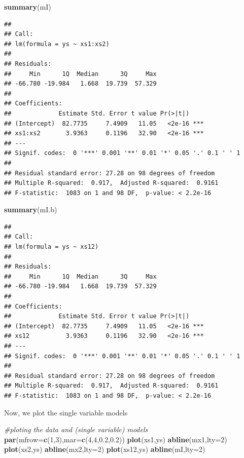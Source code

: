 \documentclass[
]{book}
\newenvironment{Shaded}{\begin{snugshade}}{\end{snugshade}}
\newcommand{\AttributeTok}[1]{\textcolor[rgb]{0.13,0.29,0.53}{#1}}
\newcommand{\CommentTok}[1]{\textcolor[rgb]{0.56,0.35,0.01}{\textit{#1}}}
\newcommand{\DecValTok}[1]{\textcolor[rgb]{0.00,0.00,0.81}{#1}}
\newcommand{\FloatTok}[1]{\textcolor[rgb]{0.00,0.00,0.81}{#1}}
\newcommand{\FunctionTok}[1]{\textcolor[rgb]{0.13,0.29,0.53}{\textbf{#1}}}
\newcommand{\NormalTok}[1]{#1}
\begin{document}
\begin{Shaded}
\begin{Highlighting}[]
\FunctionTok{summary}\NormalTok{(mI)}
\end{Highlighting}
\end{Shaded}

\begin{verbatim}
## 
## Call:
## lm(formula = ys ~ xs1:xs2)
## 
## Residuals:
##     Min      1Q  Median      3Q     Max 
## -66.780 -19.984   1.668  19.739  57.329 
## 
## Coefficients:
##             Estimate Std. Error t value Pr(>|t|)    
## (Intercept)  82.7735     7.4909   11.05   <2e-16 ***
## xs1:xs2       3.9363     0.1196   32.90   <2e-16 ***
## ---
## Signif. codes:  0 '***' 0.001 '**' 0.01 '*' 0.05 '.' 0.1 ' ' 1
## 
## Residual standard error: 27.28 on 98 degrees of freedom
## Multiple R-squared:  0.917,  Adjusted R-squared:  0.9161 
## F-statistic:  1083 on 1 and 98 DF,  p-value: < 2.2e-16
\end{verbatim}

\begin{Shaded}
\begin{Highlighting}[]
\FunctionTok{summary}\NormalTok{(mI.b)}
\end{Highlighting}
\end{Shaded}

\begin{verbatim}
## 
## Call:
## lm(formula = ys ~ xs12)
## 
## Residuals:
##     Min      1Q  Median      3Q     Max 
## -66.780 -19.984   1.668  19.739  57.329 
## 
## Coefficients:
##             Estimate Std. Error t value Pr(>|t|)    
## (Intercept)  82.7735     7.4909   11.05   <2e-16 ***
## xs12          3.9363     0.1196   32.90   <2e-16 ***
## ---
## Signif. codes:  0 '***' 0.001 '**' 0.01 '*' 0.05 '.' 0.1 ' ' 1
## 
## Residual standard error: 27.28 on 98 degrees of freedom
## Multiple R-squared:  0.917,  Adjusted R-squared:  0.9161 
## F-statistic:  1083 on 1 and 98 DF,  p-value: < 2.2e-16
\end{verbatim}

Now, we plot the single variable models

\begin{Shaded}
\begin{Highlighting}[]
\CommentTok{\#ploting the data and (single variable) models}
\FunctionTok{par}\NormalTok{(}\AttributeTok{mfrow=}\FunctionTok{c}\NormalTok{(}\DecValTok{1}\NormalTok{,}\DecValTok{3}\NormalTok{),}\AttributeTok{mar=}\FunctionTok{c}\NormalTok{(}\DecValTok{4}\NormalTok{,}\DecValTok{4}\NormalTok{,}\FloatTok{0.2}\NormalTok{,}\FloatTok{0.2}\NormalTok{))}
\FunctionTok{plot}\NormalTok{(xs1,ys)}
\FunctionTok{abline}\NormalTok{(mx1,}\AttributeTok{lty=}\DecValTok{2}\NormalTok{)}
\FunctionTok{plot}\NormalTok{(xs2,ys)}
\FunctionTok{abline}\NormalTok{(mx2,}\AttributeTok{lty=}\DecValTok{2}\NormalTok{)}
\FunctionTok{plot}\NormalTok{(xs12,ys)}
\FunctionTok{abline}\NormalTok{(mI,}\AttributeTok{lty=}\DecValTok{2}\NormalTok{)}
\end{Highlighting}
\end{Shaded}
\end{document}
